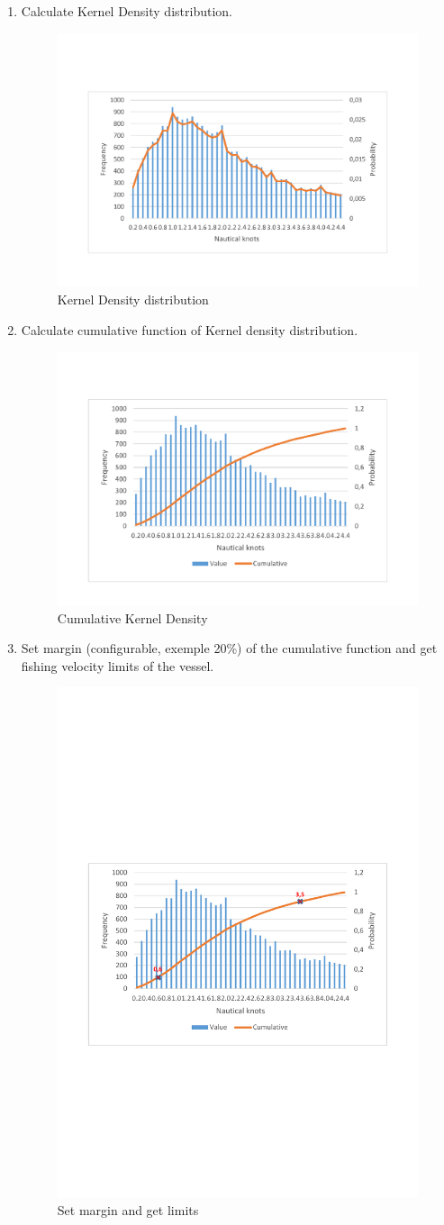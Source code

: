 \begin{enumerate}

\newpage
\item Calculate Kernel Density distribution.
\begin{figure}[H]
    \centering
    \includegraphics[trim=0 80 0 80,height=0.45\linewidth]{Chapters/img/hist_kernel.pdf}
    \caption{Kernel Density distribution}
    \label{fig:app_b_6}
\end{figure}

\item Calculate cumulative function of Kernel density distribution.
\begin{figure}[H]
    \centering
    \includegraphics[trim=0 80 0 80,height=0.45\linewidth]{Chapters/img/hist_comulative.pdf}
    \caption{Cumulative Kernel Density}
    \label{fig:app_b_7}
\end{figure}
\newpage %
\item Set margin (configurable, exemple 20\%) of the cumulative function and get fishing velocity limits of the vessel.
\begin{figure}[H]
    \centering
    \includegraphics[trim=300 250 300 300,height=0.5\linewidth]{Chapters/img/hc_8.pdf}
    \caption{Set margin and get limits}
    \label{fig:app_b_8}
\end{figure}



\end{enumerate}
